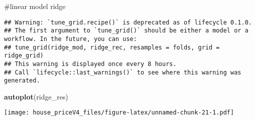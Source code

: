 \documentclass[
]{article}
\newenvironment{Shaded}{\begin{snugshade}}{\end{snugshade}}
\newcommand{\DataTypeTok}[1]{\textcolor[rgb]{0.13,0.29,0.53}{#1}}
\newcommand{\DecValTok}[1]{\textcolor[rgb]{0.00,0.00,0.81}{#1}}
\newcommand{\FloatTok}[1]{\textcolor[rgb]{0.00,0.00,0.81}{#1}}
\newcommand{\KeywordTok}[1]{\textcolor[rgb]{0.13,0.29,0.53}{\textbf{#1}}}
\newcommand{\NormalTok}[1]{#1}
\newcommand{\OperatorTok}[1]{\textcolor[rgb]{0.81,0.36,0.00}{\textbf{#1}}}
\newcommand{\StringTok}[1]{\textcolor[rgb]{0.31,0.60,0.02}{#1}}
\begin{document}
\#linear model ridge

\begin{Shaded}
\end{Shaded}

\begin{verbatim}
## Warning: `tune_grid.recipe()` is deprecated as of lifecycle 0.1.0.
## The first argument to `tune_grid()` should be either a model or a workflow. In the future, you can use:
## tune_grid(ridge_mod, ridge_rec, resamples = folds, grid = ridge_grid)
## This warning is displayed once every 8 hours.
## Call `lifecycle::last_warnings()` to see where this warning was generated.
\end{verbatim}

\begin{Shaded}
\begin{Highlighting}[]
\KeywordTok{autoplot}\NormalTok{(ridge_res)}
\end{Highlighting}
\end{Shaded}

\texttt{[image: house\_priceV4\_files/figure-latex/unnamed-chunk-21-1.pdf]}
\end{document}
